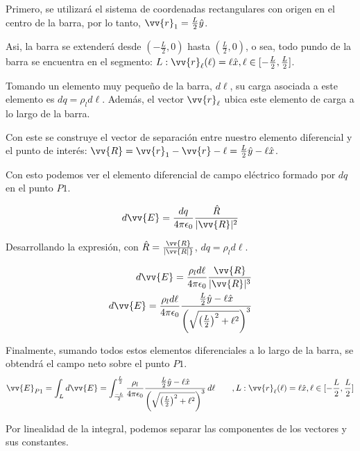 \documentclass[11pt]{article}
\begin{document}
\begin{solucion}
    Primero, se utilizará el sistema de coordenadas rectangulares con origen en el centro de la barra, por lo tanto, $\vv{r}_1 = \frac{L}{2}\hat{y}$.


    Asi, la barra se extenderá desde $(-\frac{L}{2}, 0)$ hasta $(\frac{L}{2}, 0)$, o sea, todo pundo de la barra se encuentra en el segmento: $L: \vv{r}_\ell(\ell) = \ell\hat{x}, \ell\in[-\frac{L}{2}, \frac{L}{2}]$.

    Tomando un elemento muy pequeño de la barra, $d\ell$, su carga asociada a este elemento es $dq = \rho_ld\ell$. Además, el vector $\vv{r}_\ell$ ubica este elemento de carga a lo largo de la barra.

    Con este se construye el vector de separación entre nuestro elemento diferencial y el punto de interés: $\vv{R} = \vv{r}_1 - \vv{r}-\ell = \frac{L}{2}\hat{y} - \ell\hat{x}$.

    Con esto podemos ver el elemento diferencial de campo eléctrico formado por $dq$ en el punto $P1$.

    \begin{equation}
        d\vv{E} = \frac{dq}{4\pi\epsilon_0}\frac{\hat{R}}{|\vv{R}|^2}
    \end{equation}

    Desarrollando la expresión, con $\hat{R} = \frac{\vv{R}}{|\vv{R|}}$, $dq = \rho_ld\ell$.

    \begin{align}
        d\vv{E} = \frac{\rho_l d\ell}{4\pi\epsilon_0}\frac{\vv{R}}{|\vv{R}|^3}
        \\
        d\vv{E} = \frac{\rho_l d\ell}{4\pi\epsilon_0}\frac{\frac{L}{2}\hat{y} - \ell\hat{x}}{\left(\sqrt{\left(\frac{L}{2}\right)^2 + \ell^2}\right)^3}
    \end{align}

    Finalmente, sumando todos estos elementos diferenciales a lo largo de la barra, se obtendrá el campo neto sobre el punto $P1$.
    \begin{equation}
        \vv{E}_{P1} = \int_L d\vv{E} = \int_{\frac{-L}{2}}^{\frac{L}{2}} \frac{\rho_l}{4\pi\epsilon_0}\frac{\frac{L}{2}\hat{y} - \ell\hat{x}}{\left(\sqrt{\left(\frac{L}{2}\right)^2 + \ell^2}\right)^3}\,  d\ell \qquad, L: \vv{r}_\ell(\ell) = \ell\hat{x}, \ell\in[-\frac{L}{2}, \frac{L}{2}]
    \end{equation}

    Por linealidad de la integral, podemos separar las componentes de los vectores y sus constantes.


\end{solucion}
\end{document}
